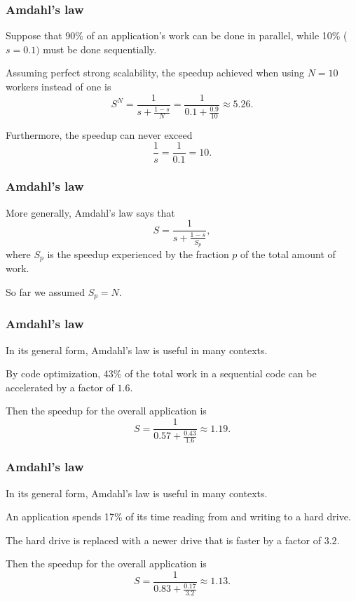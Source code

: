 \documentclass[12pt,t]{beamer}
\let\emph\relax %
\begin{document}
  \begin{frame}[fragile]
    \frametitle{Amdahl's law}

    \emph{Example:} Suppose that 90\% of an application's work can be done in parallel, while 10\% ($s=0.1)$ must be done sequentially.

    Assuming perfect strong scalability, the speedup achieved when using $N=10$ workers instead of one is
    \[S^N=\frac 1{s+\frac{1-s}N}=\frac 1{0.1+\frac{0.9}{10}}\approx 5.26.\]

    Furthermore, the speedup can never exceed
    \[\frac 1s=\frac 1{0.1}=10.\]
  \end{frame}

  \begin{frame}[fragile]
    \frametitle{Amdahl's law}

    More generally, Amdahl's law says that
    \[S=\frac 1{s+\frac{1-s}{S_p}},\]
    where $S_p$ is the speedup experienced by the fraction $p$ of the total amount of work.

    So far we assumed $S_p=N$.
  \end{frame}

  \begin{frame}[fragile]
    \frametitle{Amdahl's law}

    In its general form, Amdahl's law is useful in many contexts.

    \emph{Example:} By code optimization, 43\% of the total work in a sequential code can be accelerated by a factor of $1.6$.

    Then the speedup for the overall application is
    \[S=\frac 1{0.57+\frac{0.43}{1.6}}\approx 1.19.\]
  \end{frame}

  \begin{frame}[fragile]
    \frametitle{Amdahl's law}

    In its general form, Amdahl's law is useful in many contexts.

    \emph{Example:} An application spends 17\% of its time reading from and writing to a hard drive.

    The hard drive is replaced with a newer drive that is faster by a factor of $3.2$.

    Then the speedup for the overall application is
    \[S=\frac 1{0.83+\frac{0.17}{3.2}}\approx 1.13.\]
  \end{frame}
\end{document}
